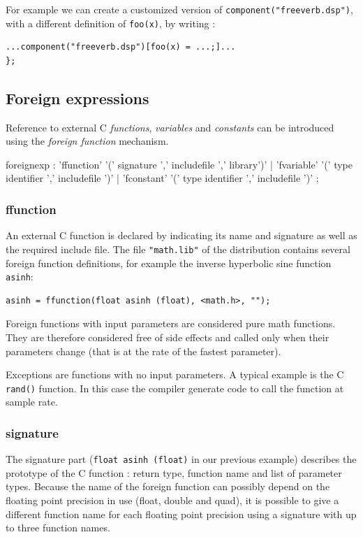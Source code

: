 For example we can create a customized version of \lstinline'component("freeverb.dsp")', with a different definition of \lstinline'foo(x)', by writing :
\begin{lstlisting}
...component("freeverb.dsp")[foo(x) = ...;]...
};
\end{lstlisting}

\subsection{Foreign expressions}

Reference to external C \textit{functions}, \textit{variables} and \textit{constants} can be introduced using the \textit{foreign function} mechanism.
 
\begin{rail}
foreignexp : 'ffunction' '(' signature ',' includefile ',' library')' 
          | 'fvariable' '(' type identifier ',' includefile ')' 
          | 'fconstant' '(' type identifier ',' includefile ')' ;
\end{rail}

\subsubsection{ffunction} 
An external C function is declared by indicating its name and signature as well as the required include file.
The file \lstinline'"math.lib"' of the \faust distribution contains several foreign function definitions, for example the inverse hyperbolic sine function \lstinline'asinh':

\begin{lstlisting}
asinh = ffunction(float asinh (float), <math.h>, "");
\end{lstlisting}

Foreign functions with input parameters are considered pure math functions. They are therefore considered free of side effects and called only when their parameters change (that is at the rate of the fastest parameter). 

Exceptions are functions with no input parameters. A typical example is the C \lstinline'rand()' function. In this case the compiler generate code to call the function at sample rate.


\subsubsection{signature} 
The signature part (\lstinline'float asinh (float)' in our previous example) describes the prototype of the C function : return type, function name and list of parameter types. Because the name of the foreign function can possibly depend on the floating point precision in use (float, double and quad), it is possible to give a different function name for each floating point precision using a signature with up to three function names. 

